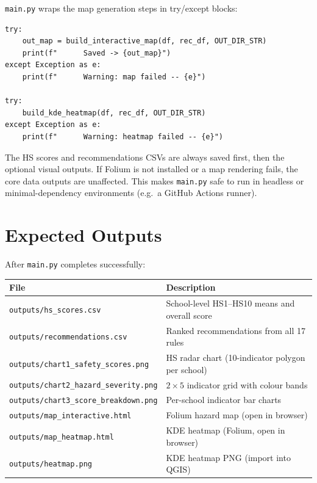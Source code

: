 \documentclass[11pt,a4paper,openany]{book}
\begin{document}
\texttt{main.py} wraps the map generation steps in try/except blocks:

\begin{lstlisting}[style=python, caption={Graceful degradation for optional outputs.}]
try:
    out_map = build_interactive_map(df, rec_df, OUT_DIR_STR)
    print(f"      Saved -> {out_map}")
except Exception as e:
    print(f"      Warning: map failed -- {e}")

try:
    build_kde_heatmap(df, rec_df, OUT_DIR_STR)
except Exception as e:
    print(f"      Warning: heatmap failed -- {e}")
\end{lstlisting}

The HS scores and recommendations CSVs are always saved first, then the optional
visual outputs.  If Folium is not installed or a map rendering fails, the core
data outputs are unaffected.  This makes \texttt{main.py} safe to run in headless
or minimal-dependency environments (e.g.\ a GitHub Actions runner).

\section{Expected Outputs}

After \texttt{main.py} completes successfully:

\begin{center}
\begin{tabular}{lL{8cm}}
\toprule
File & Description \\
\midrule
\texttt{outputs/hs\_scores.csv}           & School-level HS1--HS10 means and overall score \\
\texttt{outputs/recommendations.csv}      & Ranked recommendations from all 17 rules \\
\texttt{outputs/chart1\_safety\_scores.png}  & HS radar chart (10-indicator polygon per school) \\
\texttt{outputs/chart2\_hazard\_severity.png} & $2 \times 5$ indicator grid with colour bands \\
\texttt{outputs/chart3\_score\_breakdown.png} & Per-school indicator bar charts \\
\texttt{outputs/map\_interactive.html}    & Folium hazard map (open in browser) \\
\texttt{outputs/map\_heatmap.html}        & KDE heatmap (Folium, open in browser) \\
\texttt{outputs/heatmap.png}              & KDE heatmap PNG (import into QGIS) \\
\bottomrule
\end{tabular}
\end{center}
\end{document}
